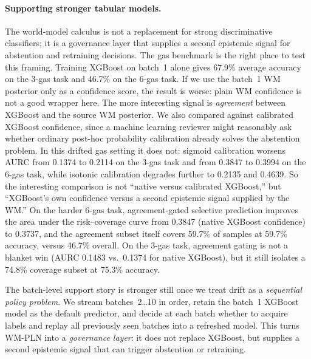 \documentclass[11pt,openany]{report}
\begin{document}
\paragraph{Supporting stronger tabular models.}
The world-model calculus is not a replacement for strong discriminative
classifiers; it is a governance layer that supplies a second epistemic
signal for abstention and retraining decisions.  The gas benchmark is the
right place to test this framing.  Training XGBoost on batch~1 alone gives 67.9\% average
accuracy on the 3-gas task and 46.7\% on the 6-gas task.  If we use the
batch~1 WM posterior only as a confidence score, the result is worse:
plain WM confidence is not a good wrapper here.  The more interesting
signal is \emph{agreement} between XGBoost and the source WM posterior.
We also compared against calibrated XGBoost confidence, since a machine
learning reviewer might reasonably ask whether ordinary post-hoc
probability calibration already solves the abstention problem.  In this
drifted gas setting it does not: sigmoid calibration worsens AURC from
0.1374 to 0.2114 on the 3-gas task and from 0.3847 to 0.3994 on the
6-gas task, while isotonic calibration degrades further to 0.2135 and
0.4639.  So the interesting comparison is not ``native versus calibrated
XGBoost,'' but ``XGBoost's own confidence versus a second epistemic
signal supplied by the WM.''  On the harder 6-gas task,
agreement-gated selective prediction improves
the area under the risk--coverage curve from 0.3847 (native XGBoost
confidence) to 0.3737, and the agreement subset itself covers 59.7\% of
samples at 59.7\% accuracy, versus 46.7\% overall.  On the 3-gas task,
agreement gating is not a blanket win (AURC 0.1483 vs.\ 0.1374 for
native XGBoost), but it still isolates a 74.8\% coverage subset at
75.3\% accuracy.

The batch-level support story is stronger still once we treat drift as a
\emph{sequential policy problem}.  We stream batches~2\ldots10 in order,
retain the batch~1 XGBoost model as the default predictor, and decide at
each batch whether to acquire labels and replay all previously seen
batches into a refreshed model.  This turns WM-PLN into a
\emph{governance layer}: it does not replace XGBoost, but supplies a
second epistemic signal that can trigger abstention or retraining.
\end{document}
